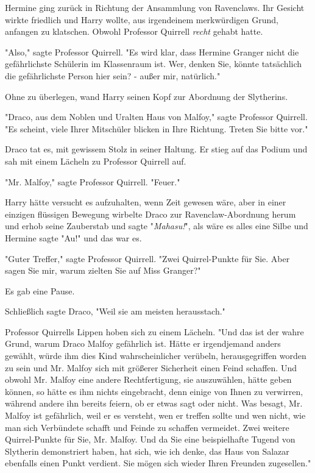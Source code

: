 {Hermine ging zurück in Richtung der Ansammlung von Ravenclaws. Ihr Gesicht wirkte friedlich und Harry wollte, aus irgendeinem merkwürdigen Grund, anfangen zu klatschen. Obwohl Professor Quirrell \emph{recht} gehabt hatte.

"Also," sagte Professor Quirrell. "Es wird klar, dass Hermine Granger nicht die gefährlichste Schülerin im Klassenraum ist. Wer, denken Sie, könnte tatsächlich die gefährlichste Person hier sein? - außer mir, natürlich."

Ohne zu überlegen, wand Harry seinen Kopf zur Abordnung der Slytherins.

"Draco, aus dem Noblen und Uralten Haus von Malfoy," sagte Professor Quirrell. "Es scheint, viele Ihrer Mitschüler blicken in Ihre Richtung. Treten Sie bitte vor."

Draco tat es, mit gewissem Stolz in seiner Haltung. Er stieg auf das Podium und sah mit einem Lächeln zu Professor Quirrell auf.

"Mr. Malfoy," sagte Professor Quirrell. "Feuer."

Harry hätte versucht es aufzuhalten, wenn Zeit gewesen wäre, aber in einer einzigen flüssigen Bewegung wirbelte Draco zur Ravenclaw-Abordnung herum und erhob seine Zauberstab und sagte "\emph{Mahasu!}", als wäre es alles eine Silbe und Hermine sagte "Au!" und das war es.

"Guter Treffer," sagte Professor Quirrell. "Zwei Quirrel-Punkte für Sie. Aber sagen Sie mir, warum zielten Sie auf Miss Granger?"

Es gab eine Pause.

Schließlich sagte Draco, "Weil sie am meisten herausstach."

Professor Quirrells Lippen hoben sich zu einem Lächeln. "Und das ist der wahre Grund, warum Draco Malfoy gefährlich ist. Hätte er irgendjemand anders gewählt, würde ihm dies Kind wahrscheinlicher verübeln, herausgegriffen worden zu sein und Mr. Malfoy sich mit größerer Sicherheit einen Feind schaffen. Und obwohl Mr. Malfoy eine andere Rechtfertigung, sie auszuwählen, hätte geben können, so hätte es ihm nichts eingebracht, denn einige von Ihnen zu verwirren, während andere ihn bereits feiern, ob er etwas sagt oder nicht. Was besagt, Mr. Malfoy ist gefährlich, weil er es versteht, wen er treffen sollte und wen nicht, wie man sich Verbündete schafft und Feinde zu schaffen vermeidet. Zwei weitere Quirrel-Punkte für Sie, Mr. Malfoy. Und da Sie eine beispielhafte Tugend von Slytherin demonstriert haben, hat sich, wie ich denke, das Haus von Salazar ebenfalls einen Punkt verdient. Sie mögen sich wieder Ihren Freunden zugesellen."

}
